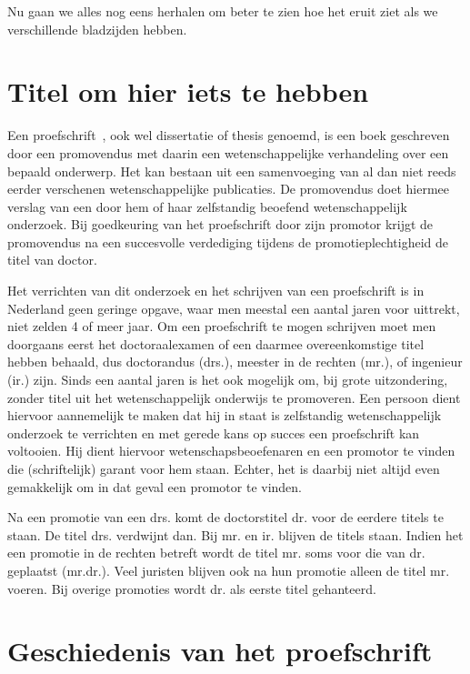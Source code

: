 Nu  gaan we  alles nog  eens herhalen  om beter  te zien  hoe het  eruit ziet  als  we verschillende
bladzijden hebben.


\section{Titel om hier iets te hebben}
\label{sec:titel-om-hier}


Een proefschrift~\cite{wiki}, ook wel dissertatie of thesis genoemd, is een boek
geschreven door een promovendus met daarin een wetenschappelijke
verhandeling over een bepaald onderwerp. Het kan bestaan uit een
samenvoeging van al dan niet reeds eerder verschenen wetenschappelijke
publicaties. De promovendus doet hiermee verslag van een door hem of
haar zelfstandig beoefend wetenschappelijk onderzoek. Bij goedkeuring
van het proefschrift door zijn promotor krijgt de promovendus na een
succesvolle verdediging tijdens de promotieplechtigheid de titel van
doctor.

Het verrichten van dit onderzoek en het schrijven van een proefschrift
is in Nederland geen geringe opgave, waar men meestal een aantal jaren
voor uittrekt, niet zelden 4 of meer jaar. Om een proefschrift te
mogen schrijven moet men doorgaans eerst het doctoraalexamen of een
daarmee overeenkomstige titel hebben behaald, dus doctorandus (drs.),
meester in de rechten (mr.), of ingenieur (ir.) zijn. Sinds een aantal
jaren is het ook mogelijk om, bij grote uitzondering, zonder titel uit
het wetenschappelijk onderwijs te promoveren. Een persoon dient
hiervoor aannemelijk te maken dat hij in staat is zelfstandig
wetenschappelijk onderzoek te verrichten en met gerede kans op succes
een proefschrift kan voltooien. Hij dient hiervoor
wetenschapsbeoefenaren en een promotor te vinden die (schriftelijk)
garant voor hem staan. Echter, het is daarbij niet altijd even
gemakkelijk om in dat geval een promotor te vinden.

Na een promotie van een drs. komt de doctorstitel dr. voor de eerdere
titels te staan. De titel drs. verdwijnt dan. Bij mr. en ir. blijven
de titels staan. Indien het een promotie in de rechten betreft wordt
de titel mr. soms voor die van dr. geplaatst (mr.dr.). Veel juristen
blijven ook na hun promotie alleen de titel mr. voeren. Bij overige
promoties wordt dr. als eerste titel gehanteerd.

\section{Geschiedenis van het proefschrift}
\label{sec:geschiedenis-van-het}


